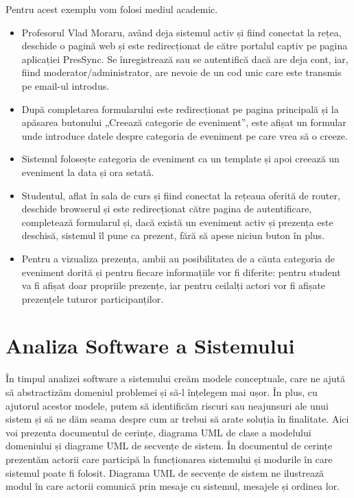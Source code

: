 \documentclass[a4paper,12pt,oneside]{report}
\begin{document}
Pentru acest exemplu vom folosi mediul academic.
\begin{itemize}
    \item Profesorul Vlad Moraru, având deja sistemul activ și fiind conectat la rețea, deschide o pagină web și este redirecționat de către portalul captiv pe pagina aplicației PresSync. Se înregistrează sau se autentifică dacă are deja cont, iar, fiind moderator/administrator, are nevoie de un cod unic care este transmis pe email-ul introdus.

    \item După completarea formularului este redirecționat pe pagina principală și la apăsarea butonului „Creează categorie de eveniment”, este afișat un formular unde introduce datele despre categoria de eveniment pe care vrea să o creeze.

    \item Sistemul folosește categoria de eveniment ca un template și apoi creează un eveniment la data și ora setată.

    \item Studentul, aflat în sala de curs și fiind conectat la rețeaua oferită de router, deschide browserul și este redirecționat către pagina de autentificare, completează formularul și, dacă există un eveniment activ și prezența este deschisă, sistemul îl pune ca prezent, fără să apese niciun buton în plus.

\item Pentru a vizualiza prezența, ambii au posibilitatea de a căuta categoria de eveniment dorită și pentru fiecare informațiile vor fi diferite: pentru student va fi afișat doar propriile prezențe, iar pentru ceilalți actori vor fi afișate prezențele tuturor participanților.

\end{itemize}

\chapter{Analiza Software a Sistemului}

În timpul analizei software a sistemului creăm modele conceptuale, care ne ajută să abstractizăm domeniul problemei și să-l înțelegem mai ușor. În plus, cu ajutorul acestor modele, putem să identificăm riscuri sau neajunsuri ale unui sistem și să ne dăm seama despre cum ar trebui să arate soluția în finalitate.
Aici voi prezenta documentul de cerințe, diagrama UML de clase a modelului domeniului și diagrame UML de secvențe de sistem.
În documentul de cerințe prezentăm actorii care participă la funcționarea sistemului și modurile în care sistemul poate fi folosit.
Diagrama UML de secvențe de sistem ne ilustrează modul în care actorii comunică prin mesaje cu sistemul, mesajele și ordinea lor.
\end{document}
